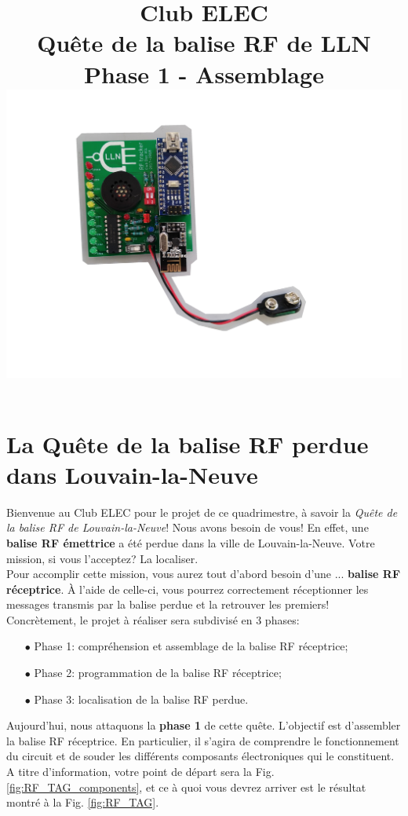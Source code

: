 \documentclass[a4paper,10pt,twoside]{article}
\title{	
	\vspace{2.5cm}
	\normalfont \normalsize 
	\huge Club ELEC\\ 
	\huge Quête de la balise RF de LLN\\
	\huge Phase 1 - Assemblage
	\includegraphics[width=.9\textwidth]{imgs/RF_TAG_withoutBackground.jpg}
	\vspace{2.5cm}
	\centering
}
\begin{document}
\renewcommand{\figurename}{Fig.}
\renewcommand{\thepage}{\roman{page}}
\setcounter{page}{1}

\maketitle
\newpage
{}
\pagestyle{main}

\newpage
\null
\thispagestyle{empty}
\newpage
\clearpage

\setcounter{page}{1}

\section*{La Quête de la balise RF perdue dans Louvain-la-Neuve}

Bienvenue au Club ELEC pour le projet de ce quadrimestre, à savoir la \textit{Quête de la balise RF de Louvain-la-Neuve}! Nous avons besoin de vous! En effet, une \textbf{balise RF émettrice} a été perdue dans la ville de Louvain-la-Neuve. Votre mission, si vous l'acceptez? La localiser.\\ 

Pour accomplir cette mission, vous aurez tout d'abord besoin d'une ... \textbf{balise RF réceptrice}. À l'aide de celle-ci, vous pourrez correctement réceptionner les messages transmis par la balise perdue et la retrouver les premiers!
\\

Concrètement, le projet à réaliser sera subdivisé en 3 phases:\\
\begin{itemize}
	\item[$\bullet$] Phase 1: compréhension et assemblage de la balise RF réceptrice;
	\item[$\bullet$] Phase 2: programmation de la balise RF réceptrice;
	\item[$\bullet$] Phase 3: localisation de la balise RF perdue. \newline
\end{itemize}

Aujourd'hui, nous attaquons la \textbf{phase 1} de cette quête. L'objectif est d'assembler la balise RF réceptrice. En particulier, il s'agira de comprendre le fonctionnement du circuit et de souder les différents composants électroniques qui le constituent. A titre d'information, votre point de départ sera la Fig. \ref{fig:RF_TAG_components}, et ce à quoi vous devrez arriver est le résultat montré à la Fig. \ref{fig:RF_TAG}.\\
\end{document}
